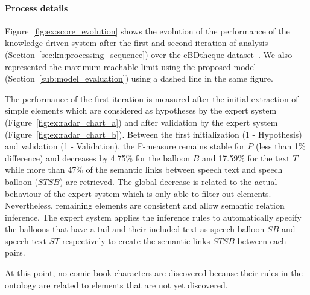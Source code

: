 

\paragraph{Process details} %
\label{par:process_details}

Figure~\ref{fig:ex:score_evolution} shows the evolution of the performance of the knowledge-driven system after the first and second iteration of analysis (Section~\ref{sec:kn:processing_sequence}) over the eBDtheque dataset~\cite{Guerin2013}.
We also represented the maximum reachable limit using the proposed model (Section~\ref{sub:model_evaluation}) using a  dashed line in the same figure.


The performance of the first iteration is measured after the initial extraction of simple elements which are considered as hypotheses by the expert system (Figure~\ref{fig:ex:radar_chart_a}) and after validation by the expert system (Figure~\ref{fig:ex:radar_chart_b}).
Between the first initialization (1 - Hypothesis) and validation (1 - Validation), the F-measure remains stable for $P$ (less than 1\% difference) and decreases by 4.75\% for the balloon $B$ and 17.59\% for the text $T$ while more than 47\% of the semantic links between speech text and speech balloon ($STSB$) are retrieved.
The global decrease is related to the actual behaviour of the expert system which is only able to filter out elements.
Nevertheless, remaining elements are consistent and allow semantic relation inference.
The expert system applies the inference rules to automatically specify the balloons that have a tail and their included text as speech balloon $SB$ and speech text $ST$ respectively to create the semantic links $STSB$ between each pairs.

At this point, no comic book characters are discovered because their rules in the ontology are related to elements that are not yet discovered.

